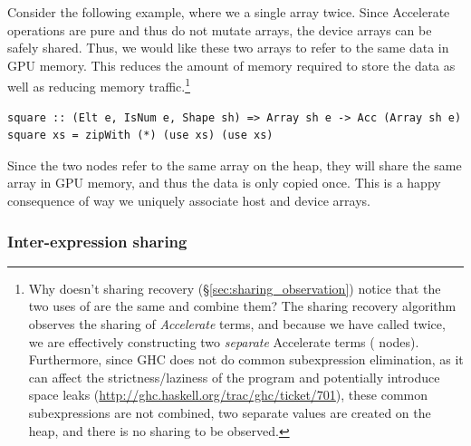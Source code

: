 Consider the following example, where we  a single array twice. Since
Accelerate operations are pure and thus do not mutate arrays, the device arrays
can be safely shared. Thus, we would like these two arrays to refer to the same
data in GPU memory. This reduces the amount of memory required to store the data
as well as reducing memory traffic.\footnote{Why doesn't sharing recovery
(\S\ref{sec:sharing_observation}) notice that the two uses of  are
the same and combine them? The sharing recovery algorithm observes the sharing
of \emph{Accelerate} terms, and because we have called  twice, we
are effectively constructing two \emph{separate} Accelerate terms
( nodes). Furthermore, since GHC does not do common subexpression
elimination, as it can affect the strictness/laziness of the program and
potentially introduce space leaks
(\url{http://ghc.haskell.org/trac/ghc/ticket/701}), these common subexpressions
are not combined, two separate values are created on the heap, and there is no
sharing to be observed.}
%
\begin{lstlisting}[style=haskell]
square :: (Elt e, IsNum e, Shape sh) => Array sh e -> Acc (Array sh e)
square xs = zipWith (*) (use xs) (use xs)
\end{lstlisting}

Since the two  nodes refer to the same array on the heap, they will
share the same array in GPU memory, and thus the data is only copied once. This
is a happy consequence of way we uniquely associate host and device arrays.


\subsubsection{Inter-expression sharing}

